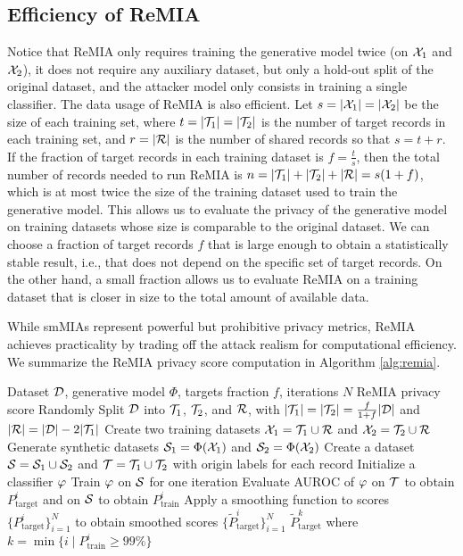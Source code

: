 \subsection{Efficiency of ReMIA}
Notice that ReMIA only requires training the generative model twice (on $\mathcal{X}_1$ and $\mathcal{X}_2$), it does not require any auxiliary dataset, but only a hold-out split of the original dataset, and the attacker model only consists in training a single classifier.
The data usage of ReMIA is also efficient. Let $s = |\mathcal{X}_1| = |\mathcal{X}_2|$ be the size of each training set, where $t = |\mathcal{T}_1| = |\mathcal{T}_2|$ is the number of target records in each training set, and $r = |\mathcal{R}|$ is the number of shared records so that $s = t + r$. If the fraction of target records in each training dataset is $f = \frac{t}{s}$, then the total number of records needed to run ReMIA is $n = |\mathcal{T}_1|+|\mathcal{T}_2|+|\mathcal{R}| = s(1+f)$, which is at most twice the size of the training dataset used to train the generative model.
This allows us to evaluate the privacy of the generative model on training datasets whose size is comparable to the original dataset. 
We can choose a fraction of target records $f$ that is large enough to obtain a statistically stable result, i.e., that does not depend on the specific set of target records. On the other hand, a small fraction allows us to evaluate ReMIA on a training dataset that is closer in size to the total amount of available data.

While smMIAs represent powerful but prohibitive privacy metrics, ReMIA achieves practicality by trading off the attack realism for computational efficiency.
We summarize the ReMIA privacy score computation in Algorithm \ref{alg:remia}.
\begin{algorithm}[t]
\caption{ReMIA privacy score computation}
\label{alg:remia}
\begin{algorithmic}[1]
\Require Dataset $\mathcal{D}$, generative model $\Phi$, targets fraction $f$, iterations $N$
\Ensure ReMIA privacy score
\State Randomly Split $\mathcal{D}$ into $\mathcal{T}_1$, $\mathcal{T}_2$, and $\mathcal{R}$, with $|\mathcal{T}_1| = |\mathcal{T}_2| = \frac{f}{1+f}|\mathcal{D}|$ and $|\mathcal{R}| = |\mathcal{D}| - 2|\mathcal{T}_1|$
\State Create two training datasets $\mathcal{X}_1 = \mathcal{T}_1 \cup \mathcal{R}$ and $\mathcal{X}_2 = \mathcal{T}_2 \cup \mathcal{R}$
\State Generate synthetic datasets $\mathcal{S}_1 = \Phi(\mathcal{X}_1)$ and $\mathcal{S}_2 = \Phi(\mathcal{X}_2)$
\State Create a dataset $\mathcal{S} = \mathcal{S}_1 \cup \mathcal{S}_2$ and $\mathcal{T} = \mathcal{T}_1 \cup \mathcal{T}_2$ with origin labels for each record
\State Initialize a classifier $\varphi$
  \State Train $\varphi$ on $\mathcal{S}$ for one iteration
  \State Evaluate AUROC of $\varphi$ on $\mathcal{T}$ to obtain $P_{\text{target}}^i$ and on $\mathcal{S}$ to obtain $P_{\text{train}}^i$
\EndFor
\State Apply a smoothing function to scores $\{P^i_{\text{target}}\}_{i=1}^N$ to obtain smoothed scores $\{\tilde{P}^i_{\text{target}}\}_{i=1}^N$
\State \Return $\tilde P^k_{\text{target}}$ where $k = \min\{ i \mid P_{\text{train}}^i \geq 99\%\}$
\end{algorithmic}
\end{algorithm}
